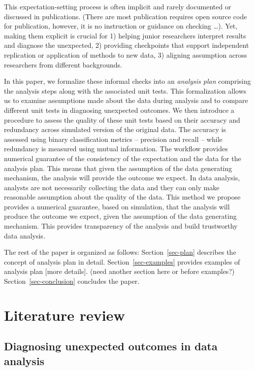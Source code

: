 \documentclass[
]{jds}
\begin{document}
This expectation-setting process is often implicit and rarely documented
or discussed in publications. (There are most publication requires open
source code for publication, however, it is no instruction or guidance
on checking \ldots). Yet, making them explicit is crucial for 1) helping
junior researchers interpret results and diagnose the unexpected, 2)
providing checkpoints that support independent replication or
application of methods to new data, 3) aligning assumption across
researchers from different backgrounds.

In this paper, we formalize these informal checks into an \emph{analysis
plan} comprising the analysis steps along with the associated unit
tests. This formalization allows us to examine assumptions made about
the data during analysis and to compare different unit tests in
diagnosing unexpected outcomes. We then introduce a procedure to assess
the quality of these unit tests based on their accuracy and redundancy
across simulated version of the original data. The accuracy is assessed
using binary classification metrics -- precision and recall -- while
redundancy is measured using mutual information. The workflow provides
numerical guarantee of the consistency of the expectation and the data
for the analysis plan. This means that given the assumption of the data
generating mechanism, the analysis will provide the outcome we expect.
In data analysis, analysts are not necessarily collecting the data and
they can only make reasonable assumption about the quality of the data.
This method we propose provides a numerical guarantee, based on
simulation, that the analysis will produce the outcome we expect, given
the assumption of the data generating mechanism. This provides
transparency of the analysis and build trustworthy data analysis.

The rest of the paper is organized as follows: Section~\ref{sec-plan}
describes the concept of analysis plan in detail.
Section~\ref{sec-examples} provides examples of analysis plan {[}more
details{]}. (need another section here or before examples?)
Section~\ref{sec-conclusion} concludes the paper.

\section{Literature review}\label{literature-review}

\subsection{Diagnosing unexpected outcomes in data
analysis}\label{diagnosing-unexpected-outcomes-in-data-analysis}
\end{document}
